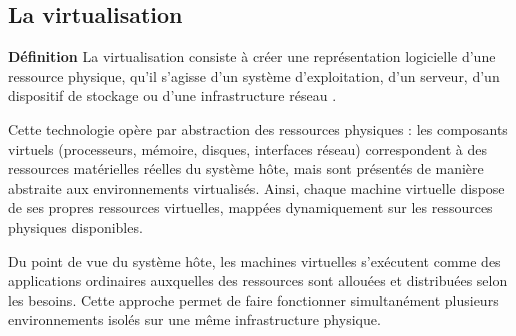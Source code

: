 \subsection{La virtualisation}
\textbf{Définition}
La virtualisation consiste à créer une représentation logicielle d'une ressource physique, qu'il s'agisse d'un système d'exploitation, d'un serveur, d'un dispositif de stockage ou d'une infrastructure réseau \cite{danny2013virtualisation,liu2014research}.

Cette technologie opère par abstraction des ressources physiques : les composants virtuels (processeurs, mémoire, disques, interfaces réseau) correspondent à des ressources matérielles réelles du système hôte, mais sont présentés de manière abstraite aux environnements virtualisés. Ainsi, chaque machine virtuelle dispose de ses propres ressources virtuelles, mappées dynamiquement sur les ressources physiques disponibles.

Du point de vue du système hôte, les machines virtuelles s'exécutent comme des applications ordinaires auxquelles des ressources sont allouées et distribuées selon les besoins. Cette approche permet de faire fonctionner simultanément plusieurs environnements isolés sur une même infrastructure physique.


